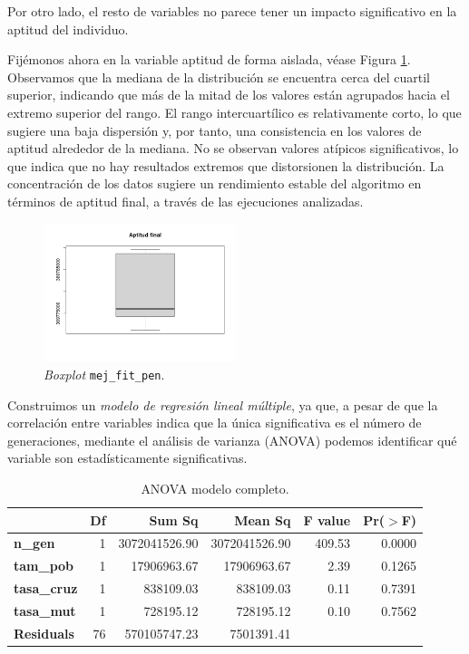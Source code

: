 \documentclass[12pt,a4paper]{book}
\begin{document}
Por otro lado, el resto de variables no parece tener un impacto significativo en la aptitud del individuo. 

Fijémonos ahora en la variable aptitud de forma aislada, véase Figura \ref{fig:box_mej_fit_plot}. Observamos que la mediana de la distribución se encuentra cerca del cuartil superior, indicando que más de la mitad de los valores están agrupados hacia el extremo superior del rango. El rango intercuartílico es relativamente corto, lo que sugiere una baja dispersión y, por tanto, una consistencia en los valores de aptitud alrededor de la mediana. No se observan valores atípicos significativos, lo que indica que no hay resultados extremos que distorsionen la distribución. La concentración de los datos sugiere un rendimiento estable del algoritmo en términos de aptitud final, a través de las ejecuciones analizadas. 

\begin{figure}[h] 
    	\begin{center}
    	\includegraphics[width=0.5\textwidth]{img/boxplot_mej_fit.png}
    	\end{center}
    	\caption{\textsl{Boxplot} \texttt{mej\_fit\_pen}.}
    	\label{fig:box_mej_fit_plot}
	\end{figure}

Construimos un \textsl{modelo de regresión lineal múltiple}, ya que, a pesar de que la correlación entre variables indica que la única significativa es el número de generaciones, mediante el análisis de varianza (ANOVA) podemos identificar qué variable son estadísticamente significativas. 

\begin{table}[ht]
\centering
\begin{tabular}{lrrrrr}
  \hline
 & \textbf{Df} & \textbf{Sum Sq} & \textbf{Mean Sq} & \textbf{F value} & \textbf{Pr($>$F)} \\ 
  \hline
\textbf{n\_gen} & 1 & 3072041526.90 & 3072041526.90 & 409.53 & 0.0000 \\ 
  \textbf{tam\_pob} & 1 & 17906963.67 & 17906963.67 & 2.39 & 0.1265 \\ 
  \textbf{tasa\_cruz }& 1 & 838109.03 & 838109.03 & 0.11 & 0.7391 \\ 
  \textbf{tasa\_mut} & 1 & 728195.12 & 728195.12 & 0.10 & 0.7562 \\ 
  \textbf{Residuals} & 76 & 570105747.23 & 7501391.41 &  &  \\ 
   \hline

\end{tabular}
\caption{ANOVA modelo completo.}
\label{tabla: modelo_completo}    
\end{table}
\end{document}
